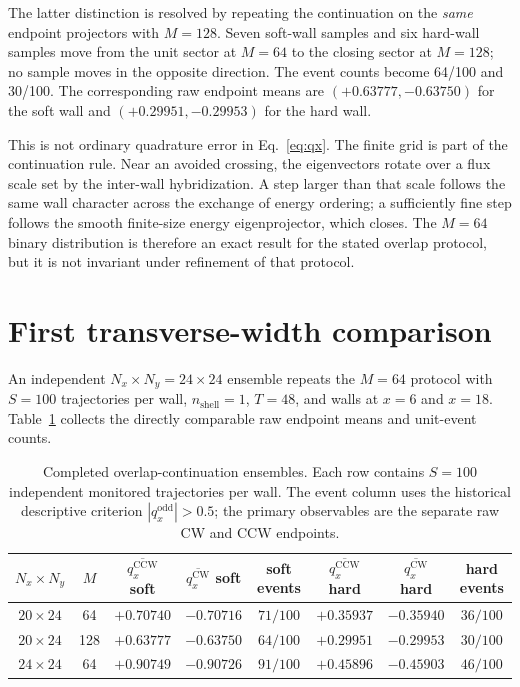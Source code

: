\documentclass[aps,prb,twocolumn,floatfix,nofootinbib,superscriptaddress]{revtex4-2}
\begin{document}
The latter distinction is resolved by repeating the continuation on the
\emph{same} endpoint projectors with $M=128$.  Seven soft-wall samples and six
hard-wall samples move from the unit sector at $M=64$ to the closing sector at
$M=128$; no sample moves in the opposite direction.  The event counts become
64/100 and 30/100.  The corresponding raw endpoint means are
$(+0.63777,-0.63750)$ for the soft wall and
$(+0.29951,-0.29953)$ for the hard wall.

This is not ordinary quadrature error in Eq.~\eqref{eq:qx}.  The finite grid is
part of the continuation rule.  Near an avoided crossing, the eigenvectors
rotate over a flux scale set by the inter-wall hybridization.  A step larger
than that scale follows the same wall character across the exchange of energy
ordering; a sufficiently fine step follows the smooth finite-size energy
eigenprojector, which closes.  The $M=64$ binary distribution is therefore an
exact result for the stated overlap protocol, but it is not invariant under
refinement of that protocol.

\section{First transverse-width comparison}

An independent $N_x\times N_y=24\times24$ ensemble repeats the $M=64$ protocol
with $S=100$ trajectories per wall, $n_{\mathrm{shell}}=1$, $T=48$, and walls at
$x=6$ and $x=18$.  Table~\ref{tab:comparison} collects the directly comparable
raw endpoint means and unit-event counts.

\begin{table}[t]
 \caption{Completed overlap-continuation ensembles.  Each row contains
 $S=100$ independent monitored trajectories per wall.  The event column uses
 the historical descriptive criterion $|q_x^{\mathrm{odd}}|>0.5$; the primary
 observables are the separate raw CW and CCW endpoints.}
 \label{tab:comparison}
 \begin{ruledtabular}
 \begin{tabular}{cccccccc}
 $N_x\times N_y$ & $M$ &
 $\overline{q_x^{\mathrm{CCW}}}$ soft & $\overline{q_x^{\mathrm{CW}}}$ soft & soft events &
 $\overline{q_x^{\mathrm{CCW}}}$ hard & $\overline{q_x^{\mathrm{CW}}}$ hard & hard events\\
 \hline
 $20\times24$ & 64  & $+0.70740$ & $-0.70716$ & $71/100$ & $+0.35937$ & $-0.35940$ & $36/100$\\
 $20\times24$ & 128 & $+0.63777$ & $-0.63750$ & $64/100$ & $+0.29951$ & $-0.29953$ & $30/100$\\
 $24\times24$ & 64  & $+0.90749$ & $-0.90726$ & $91/100$ & $+0.45896$ & $-0.45903$ & $46/100$
 \end{tabular}
 \end{ruledtabular}
\end{table}
\end{document}
